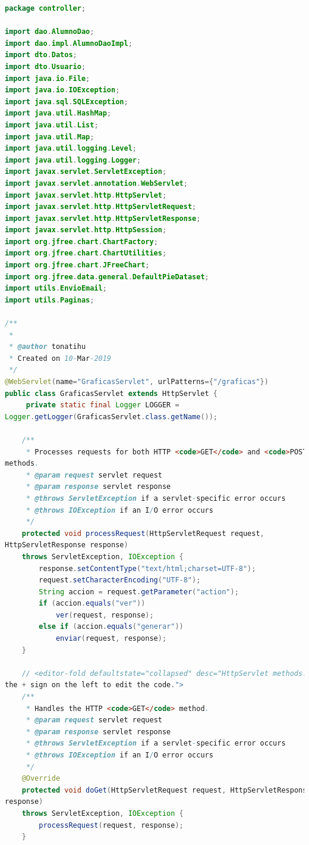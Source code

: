\documentclass[a4paper,12pt]{article}
\begin{document}
\begin{lstlisting}[language=Java, style=customJava, 
caption={GraficasServlet.java}, captionpos=b,basicstyle=\fontfamily{cmss}\small]
package controller;

import dao.AlumnoDao;
import dao.impl.AlumnoDaoImpl;
import dto.Datos;
import dto.Usuario;
import java.io.File;
import java.io.IOException;
import java.sql.SQLException;
import java.util.HashMap;
import java.util.List;
import java.util.Map;
import java.util.logging.Level;
import java.util.logging.Logger;
import javax.servlet.ServletException;
import javax.servlet.annotation.WebServlet;
import javax.servlet.http.HttpServlet;
import javax.servlet.http.HttpServletRequest;
import javax.servlet.http.HttpServletResponse;
import javax.servlet.http.HttpSession;
import org.jfree.chart.ChartFactory;
import org.jfree.chart.ChartUtilities;
import org.jfree.chart.JFreeChart;
import org.jfree.data.general.DefaultPieDataset;
import utils.EnvioEmail;
import utils.Paginas;

/**
 *
 * @author tonatihu
 * Created on 10-Mar-2019
 */
@WebServlet(name="GraficasServlet", urlPatterns={"/graficas"})
public class GraficasServlet extends HttpServlet {
     private static final Logger LOGGER = 
Logger.getLogger(GraficasServlet.class.getName());
   
    /** 
     * Processes requests for both HTTP <code>GET</code> and <code>POST</code> 
methods.
     * @param request servlet request
     * @param response servlet response
     * @throws ServletException if a servlet-specific error occurs
     * @throws IOException if an I/O error occurs
     */
    protected void processRequest(HttpServletRequest request, 
HttpServletResponse response)
    throws ServletException, IOException {
        response.setContentType("text/html;charset=UTF-8");
        request.setCharacterEncoding("UTF-8");
        String accion = request.getParameter("action");
        if (accion.equals("ver"))
            ver(request, response);
        else if (accion.equals("generar"))
            enviar(request, response);
    } 

    // <editor-fold defaultstate="collapsed" desc="HttpServlet methods. Click on 
the + sign on the left to edit the code.">
    /** 
     * Handles the HTTP <code>GET</code> method.
     * @param request servlet request
     * @param response servlet response
     * @throws ServletException if a servlet-specific error occurs
     * @throws IOException if an I/O error occurs
     */
    @Override
    protected void doGet(HttpServletRequest request, HttpServletResponse 
response)
    throws ServletException, IOException {
        processRequest(request, response);
    } 


\end{lstlisting}
\end{document}
